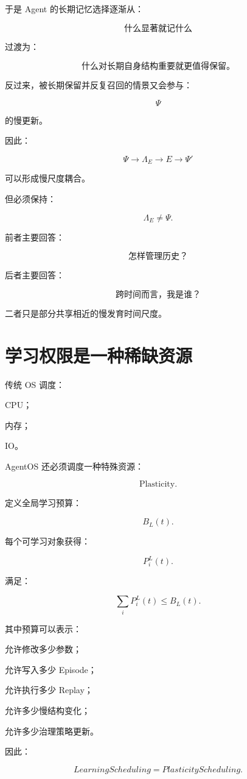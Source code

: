 于是 Agent 的长期记忆选择逐渐从：

\[
\boxed{
\text{什么显著就记什么}
}
\]

过渡为：

\[
\boxed{
\text{什么对长期自身结构重要就更值得保留。}
}
\]

反过来，被长期保留并反复召回的情景又会参与：

\[
\Psi
\]

的慢更新。

因此：

\[
\boxed{
\Psi
\rightarrow
\Lambda_E
\rightarrow
E
\rightarrow
\Psi'
}
\]

可以形成慢尺度耦合。

但必须保持：

\[
\boxed{
\Lambda_E\neq\Psi.
}
\]

前者主要回答：

\[
\boxed{
\text{怎样管理历史？}
}
\]

后者主要回答：

\[
\boxed{
\text{跨时间而言，我是谁？}
}
\]

二者只是部分共享相近的慢发育时间尺度。


\section{学习权限是一种稀缺资源}

传统 OS 调度：

CPU；

内存；

IO。

AgentOS 还必须调度一种特殊资源：

\[
\boxed{
\text{Plasticity}.
}
\]

定义全局学习预算：

\[
B_L(t).
\]

每个可学习对象获得：

\[
P_i^L(t).
\]

满足：

\[
\boxed{
\sum_iP_i^L(t)
\le
B_L(t).
}
\]

其中预算可以表示：

允许修改多少参数；

允许写入多少 Episode；

允许执行多少 Replay；

允许多少慢结构变化；

允许多少治理策略更新。

因此：

\[
\boxed{
LearningScheduling
=
PlasticityScheduling.
}
\]

